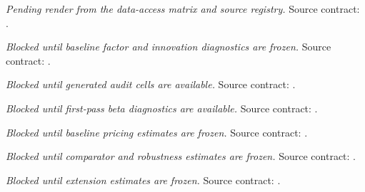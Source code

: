 
\begin{table}[htbp]
\centering
\caption{Data sources and sample construction}
\emph{Pending render from the data-access matrix and source registry.}
\smallskip
\small Source contract: .
\end{table}

\begin{table}[htbp]
\centering
\caption{Baseline factor summary and innovation diagnostics}
\emph{Blocked until baseline factor and innovation diagnostics are frozen.}
\smallskip
\small Source contract: .
\end{table}

\begin{table}[htbp]
\centering
\caption{Table-level replication comparison}
\emph{Blocked until generated audit cells are available.}
\smallskip
\small Source contract: .
\end{table}

\begin{table}[htbp]
\centering
\caption{Standardized exposure dispersion and factor strength}
\emph{Blocked until first-pass beta diagnostics are available.}
\smallskip
\small Source contract: .
\end{table}

\begin{table}[htbp]
\centering
\caption{Baseline cross-sectional pricing results}
\emph{Blocked until baseline pricing estimates are frozen.}
\smallskip
\small Source contract: .
\end{table}

\begin{table}[htbp]
\centering
\caption{Comparator-model and robustness results}
\emph{Blocked until comparator and robustness estimates are frozen.}
\smallskip
\small Source contract: .
\end{table}

\begin{table}[htbp]
\centering
\caption{Post-publication frozen and refitted evaluation}
\emph{Blocked until extension estimates are frozen.}
\smallskip
\small Source contract: .
\end{table}

